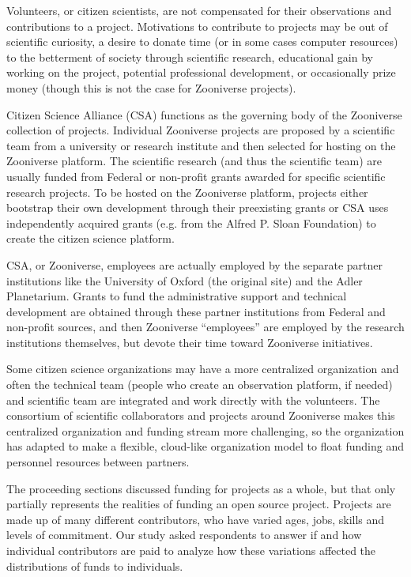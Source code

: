 
Volunteers, or citizen scientists, are not compensated for their observations and contributions to a project. Motivations to contribute to projects may be out of scientific curiosity, a desire to donate time (or in some cases computer resources) to the betterment of society through scientific research, educational gain by working on the project, potential professional development, or occasionally prize money (though this is not the case for Zooniverse projects).
 
Citizen Science Alliance (CSA) functions as the governing body of the Zooniverse collection of projects. Individual Zooniverse projects are proposed by a scientific team from a university or research institute and then selected for hosting on the Zooniverse platform. The scientific research (and thus the scientific team) are usually funded from Federal or non-profit grants awarded for specific scientific research projects. To be hosted on the Zooniverse platform, projects either bootstrap their own development through their preexisting grants or CSA uses independently acquired grants (e.g. from the Alfred P. Sloan Foundation) to create the citizen science platform.
 
CSA, or Zooniverse, employees are actually employed by the separate partner institutions like the University of Oxford (the original site) and the Adler Planetarium. Grants to fund the administrative support and technical development are obtained through these partner institutions from Federal and non-profit sources, and then Zooniverse “employees” are employed by the research institutions themselves, but devote their time toward Zooniverse initiatives.
 
Some citizen science organizations may have a more centralized organization and often the technical team (people who create an observation platform, if needed) and scientific team are integrated and work directly with the volunteers. The consortium of scientific collaborators and projects around Zooniverse makes this centralized organization and funding stream more challenging, so the organization has adapted to make a flexible, cloud-like organization model to float funding and personnel resources between partners.


The proceeding sections discussed funding for projects as a whole, but that only partially represents the realities of funding an open source project. Projects are made up of many different contributors, who have varied ages, jobs, skills and levels of commitment. Our study asked respondents to answer if and how individual contributors are paid to analyze how these variations affected the distributions of funds to individuals. 

